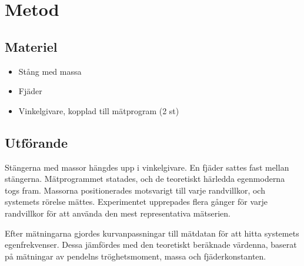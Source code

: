 \section{Metod}
\subsection{Materiel}
\begin{itemize}
    \item Stång med massa
    \item Fjäder
    \item Vinkelgivare, kopplad till mätprogram (2 st)
\end{itemize}

\subsection{Utförande}
Stängerna med massor hängdes upp i vinkelgivare. En fjäder sattes fast mellan stängerna. Mätprogrammet statades, och de teoretiskt härledda egenmoderna togs fram. Massorna positionerades motsvarigt till varje randvillkor, och systemets rörelse mättes. Experimentet upprepades flera gånger för varje randvillkor för att använda den mest representativa mätserien.

Efter mätningarna gjordes kurvanpassningar till mätdatan för att hitta systemets egenfrekvenser. Dessa jämfördes med den teoretiskt beräknade värdenna, baserat på mätningar av pendelns tröghetsmoment, massa och fjäderkonstanten.
